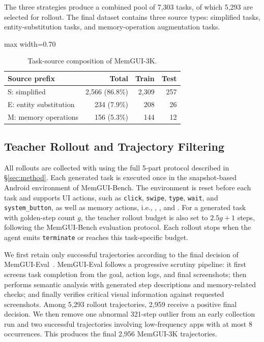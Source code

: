 The three strategies produce a combined pool of 7{,}303 tasks, of which 5{,}293 are selected for rollout. The final dataset contains three source types: simplified tasks, entity-substitution tasks, and memory-operation augmentation tasks.

\begin{table}[h]
\centering
\footnotesize
\begin{adjustbox}{max width=0.70\linewidth}
\begin{tabular}{lrrr}
\toprule
Source prefix & Total & Train & Test \\
\midrule
S: simplified & 2{,}566 (86.8\%) & 2{,}309 & 257 \\
E: entity substitution & 234 (7.9\%) & 208 & 26 \\
M: memory operations & 156 (5.3\%) & 144 & 12 \\
\bottomrule
\end{tabular}
\end{adjustbox}
\caption{Task-source composition of MemGUI-3K.}
\label{tab:appendix-prefix}
\end{table}

\subsection{Teacher Rollout and Trajectory Filtering}
\label{sec:appendix-rollout-filtering}

All rollouts are collected with  using the full 5-part \conact protocol described in \S\ref{sec:method}. Each generated task is executed once in the snapshot-based Android environment of MemGUI-Bench. The environment is reset before each task and supports UI actions, such as \texttt{click}, \texttt{swipe}, \texttt{type}, \texttt{wait}, and \texttt{system\_button}, as well as memory actions, i.e., , , and . For a generated task with golden-step count $g$, the teacher rollout budget is also set to $2.5g+1$ steps, following the MemGUI-Bench evaluation protocol. Each rollout stops when the agent emits \texttt{terminate} or reaches this task-specific budget.

We first retain only successful trajectories according to the final decision of MemGUI-Eval~\cite{liu2026memgui}. MemGUI-Eval follows a progressive scrutiny pipeline: it first screens task completion from the goal, action logs, and final screenshots; then performs semantic analysis with generated step descriptions and memory-related checks; and finally verifies critical visual information against requested screenshots. Among 5{,}293 rollout trajectories, 2{,}959 receive a positive final decision. We then remove one abnormal 321-step outlier from an early collection run and two successful trajectories involving low-frequency apps with at most 8 occurrences. This produces the final 2{,}956 MemGUI-3K trajectories.

